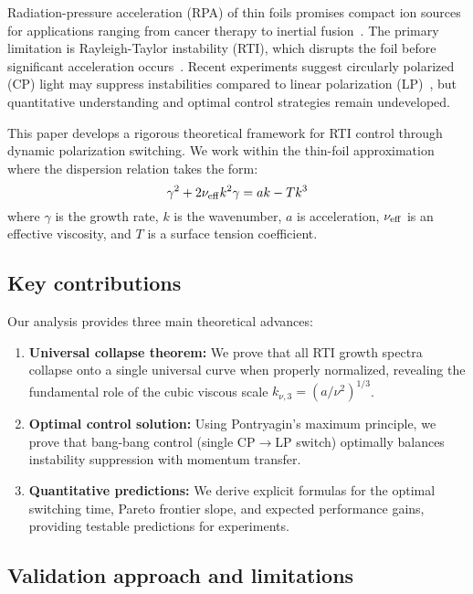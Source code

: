 \documentclass[aps,pre,twocolumn,showpacs,superscriptaddress]{revtex4-2}
\theoremstyle{definition}
\begin{document}
Radiation-pressure acceleration (RPA) of thin foils promises compact ion sources for applications ranging from cancer therapy to inertial fusion~\cite{Macchi2013RMP}. The primary limitation is Rayleigh-Taylor instability (RTI), which disrupts the foil before significant acceleration occurs~\cite{Pegoraro2007PRL}. Recent experiments suggest circularly polarized (CP) light may suppress instabilities compared to linear polarization (LP)~\cite{Henig2009PRL,Robinson2009PPCF}, but quantitative understanding and optimal control strategies remain undeveloped.

This paper develops a rigorous theoretical framework for RTI control through dynamic polarization switching. We work within the thin-foil approximation where the dispersion relation takes the form:
\begin{equation}
\gamma^2 + 2\nu_{\rm eff}k^2\gamma = ak - Tk^3
\label{eq:dispersion}
\end{equation}
where $\gamma$ is the growth rate, $k$ is the wavenumber, $a$ is acceleration, $\nu_{\rm eff}$ is an effective viscosity, and $T$ is a surface tension coefficient.

\subsection{Key contributions}

Our analysis provides three main theoretical advances:

\begin{enumerate}
\item \textbf{Universal collapse theorem:} We prove that all RTI growth spectra collapse onto a single universal curve when properly normalized, revealing the fundamental role of the cubic viscous scale $k_{\nu,3}=(a/\nu^2)^{1/3}$.

\item \textbf{Optimal control solution:} Using Pontryagin's maximum principle, we prove that bang-bang control (single CP$\to$LP switch) optimally balances instability suppression with momentum transfer.

\item \textbf{Quantitative predictions:} We derive explicit formulas for the optimal switching time, Pareto frontier slope, and expected performance gains, providing testable predictions for experiments.
\end{enumerate}

\subsection{Validation approach and limitations}
\end{document}

